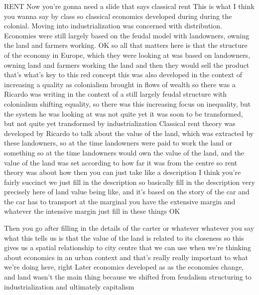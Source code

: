 RENT
Now you’re gonna need a slide that says classical rent
This is what I think you wanna say by class so classical economics developed during during the colonial. Moving into industrialization was concerned with distribution. Economies were still largely based on the feudal model with landowners, owning the land and farmers working.
OK so all that matters here is that the structure of the economy in Europe, which they were looking at was based on landowners, owning land and farmers working the land and then they would sell the product that’s what’s key to this red concept this was also developed in the context of increasing a quality as colonialism brought in flows of wealth so there was a Ricardo was writing in the context of a still largely feudal structure with colonialism shifting equality, so there was this increasing focus on inequality, but the system he was looking at was not quite yet it was soon to be transformed, but not quite yet transformed by industrialization
Classical rent theory was developed by Ricardo to talk about the value of the land, which was extracted by these landowners, so at the time landowners were paid to work the land or something so at the time landowners would own the value of the land, and the value of the land was set according to how far it was from the centre so rent theory was about how then you can just take like a description I think you’re fairly succinct we just fill in the description so basically fill in the description very precisely here of land value being like, and it’s based on the story of the car and the car has to transport at the marginal you have the extensive margin and whatever the intensive margin just fill in these things OK


Then you go after filling in the details of the carter or whatever whatever you say what this tells us is that the value of the land is related to its closeness so this gives us a spatial relationship to city centre that we can use when we’re thinking about economics in an urban context and that’s really really important to what we’re doing here, right
Later economics developed as as the economies change, and land wasn’t the main thing because we shifted from feudalism structuring to industrialization and ultimately capitalism

